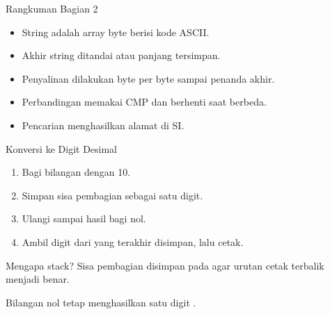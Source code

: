 \documentclass[aspectratio=169,11pt]{beamer}
\begin{document}
\begin{frame}{Rangkuman Bagian 2}
\small
\begin{itemize}
    \item String adalah array byte berisi kode ASCII.

    \vspace{0.15em}
    \item Akhir string ditandai  atau panjang tersimpan.

    \vspace{0.15em}
    \item Penyalinan dilakukan byte per byte sampai penanda akhir.

    \vspace{0.15em}
    \item Perbandingan memakai CMP dan berhenti saat berbeda.

    \vspace{0.15em}
    \item Pencarian menghasilkan alamat di SI.
\end{itemize}
\end{frame}


\begin{frame}{Konversi ke Digit Desimal}
\small
\begin{enumerate}
    \item Bagi bilangan dengan 10.
    \item Simpan sisa pembagian sebagai satu digit.
    \item Ulangi sampai hasil bagi nol.
    \item Ambil digit dari yang terakhir disimpan, lalu cetak.
\end{enumerate}

\vspace{0.25em}
\begin{block}{Mengapa stack?}
\small Sisa pembagian disimpan pada  agar urutan cetak
terbalik menjadi benar.
\end{block}

\vspace{0.15em}
{\footnotesize\color{obeGray}Bilangan nol tetap menghasilkan satu
digit .\par}
\end{frame}
\end{document}

